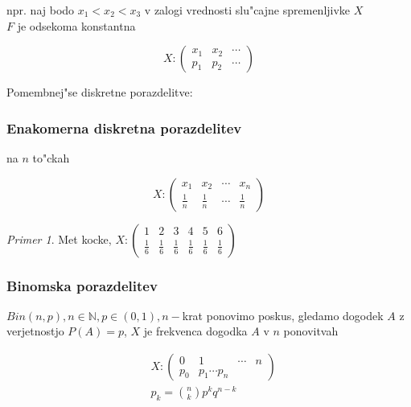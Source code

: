 \documentclass[a4paper,12pt]{article}
\theoremstyle{definition}
\theoremstyle{remark}
\newtheorem*{ex}{Primer}
\newcommand{\N}{\mathbb{N}}
\begin{document}
npr. naj bodo $x_1 < x_2 < x_3$ v zalogi vrednosti slu"cajne spremenljivke $X$ \\
$F$ je odsekoma konstantna

\begin{equation*}
    X: \begin{pmatrix}
        x_1 & x_2 & \cdots \\
        p_1 & p_2 & \cdots
    \end{pmatrix}
\end{equation*}

Pomembnej"se diskretne porazdelitve:

\subsubsection{Enakomerna diskretna porazdelitev} na $n$ to"ckah

\begin{equation*}
    X: \begin{pmatrix}
        x_1 & x_2 & \cdots & x_n \\
        \frac{1}{n} & \frac{1}{n} & \cdots & \frac{1}{n}
    \end{pmatrix}
\end{equation*}

\begin{ex}
    Met kocke, $X: \begin{pmatrix}
        1 & 2 & 3 & 4 & 5 & 6 \\
        \frac{1}{6} & \frac{1}{6} & \frac{1}{6} & \frac{1}{6} & \frac{1}{6} & \frac{1}{6}
    \end{pmatrix}$
\end{ex}

\subsubsection{Binomska porazdelitev}

$Bin(n,p), n \in \N, p \in (0,1), n-$krat ponovimo poskus, gledamo dogodek $A$ z verjetnostjo $P(A) = p$, $X$ je
frekvenca dogodka $A$ v $n$ ponovitvah

\begin{align*}
    &X: \begin{pmatrix}
            0 & 1 & \cdots & n \\
            p_0 & p_1 \cdots p_n
        \end{pmatrix} \\
    &p_k = \binom{n}{k} p^k q^{n-k}
\end{align*}
\end{document}
